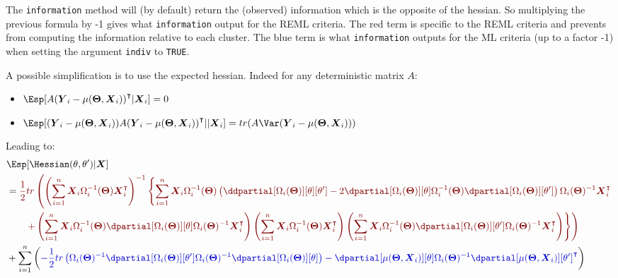 \documentclass[12pt]{article}
\newcommand{\darkblue}{blue!80!black}
\newcommand{\darkred}{red!50!black}
\newcommand\trans[1]{{#1}^\intercal}%
\newcommand{\param}{\Theta}
\newcommand{\Vparam}{\boldsymbol{\param}}
\newcommand{\VX}{\boldsymbol{X}}
\newcommand{\VY}{\boldsymbol{Y}}
\begin{document}
\bigskip

The \texttt{information} method will (by default) return the (observed)
information which is the opposite of the hessian. So multiplying the
previous formula by -1 gives what \texttt{information} output for the REML
criteria. The red term is specific to the REML criteria and prevents
from computing the information relative to each cluster. The blue term
is what \texttt{information} outputs for the ML criteria (up to a factor -1)
when setting the argument \texttt{indiv} to \texttt{TRUE}.

\bigskip

A possible simplification is to use the expected hessian. Indeed for
any deterministic matrix \(A\):
\begin{itemize}
\item \(\Esp[A \trans{(\VY_i-\mu(\Vparam,\VX_i))}|\VX_i] = 0\)
\item \(\Esp[(\VY_i-\mu(\Vparam,\VX_i)) A \trans{(\VY_i-\mu(\Vparam,\VX_i))}||\VX_i] = tr(A \Var(\VY_i-\mu(\Vparam,\VX_i)))\)
\end{itemize}
Leading to:
\begin{align*}
 & \Esp[\Hessian(\theta,\theta^{\prime})|\VX] \\
 &= \textcolor{\darkred}{ \frac{1}{2} tr \left( \left(\sum_{i=1}^n \VX_i \Omega_i^{-1}(\Vparam) \trans{\VX}_i\right)^{-1}  \left\{ \sum_{i=1}^n \VX_i \Omega_i^{-1}(\Vparam) \left( \ddpartial[\Omega_i(\Vparam)][\theta][\theta^{\prime}] - 2 \dpartial[\Omega_i(\Vparam)][\theta]  \Omega_i^{-1}(\Vparam) \dpartial[\Omega_i(\Vparam)][\theta^{\prime}]\right) \Omega_i(\Vparam)^{-1} \trans{\VX}_i \right.  \right.}  \\
 & \textcolor{\darkred}{ \left. \left. \qquad +  \left(\sum_{i=1}^n \VX_i \Omega_i^{-1}(\Vparam) \dpartial[\Omega_i(\Vparam)][\theta] \Omega_i(\Vparam)^{-1} \trans{\VX}_i\right) \left(\sum_{i=1}^n \VX_i \Omega_i^{-1}(\Vparam) \trans{\VX}_i \right) \left(\sum_{i=1}^n \VX_i \Omega_i^{-1}(\Vparam) \dpartial[\Omega_i(\Vparam)][\theta^{\prime}] \Omega_i(\Vparam)^{-1} \trans{\VX}_i\right) \right\} \right) } \\
 & + \sum_{i=1}^n \left( \textcolor{\darkblue}{
- \frac{1}{2} tr\left(\Omega_i(\Vparam)^{-1} \dpartial[\Omega_i(\Vparam)][\theta^{\prime}] \Omega_i(\Vparam)^{-1} \dpartial[\Omega_i(\Vparam)][\theta]\right)
 - \dpartial[\mu(\Vparam,\VX_i)][\theta] \Omega_i(\Vparam)^{-1} \trans{\dpartial[\mu(\Vparam,\VX_i)][\theta^{\prime}]}
 } \right) \\
\end{align*}
\end{document}
